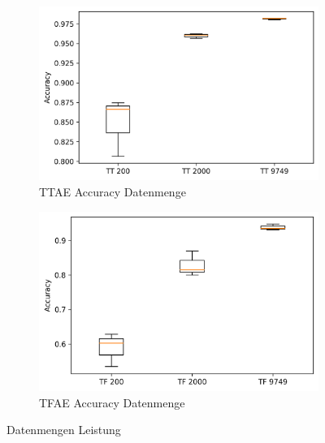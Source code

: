 	\begin{figure}[h]
		\centering
		\begin{subfigure}[c]{0.49\textwidth}			
			\includegraphics[width=1\textwidth,center]{bilder/Hauptteil/Transfer_Logs_Datenmenge/Acc_Transfer_Logs_data.png}
			\caption{TTAE Accuracy Datenmenge}
			\label{img:TT_ACC_DATA}	
		\end{subfigure}
		\begin{subfigure}[c]{0.49\textwidth}			
			\includegraphics[width=1\textwidth, center]{bilder/Hauptteil/Transfer_Logs_Datenmenge/Acc_MT_Logs_data.png}
			\caption{TFAE Accuracy Datenmenge}
			\label{img:TF_ACC_DATA}	
		\end{subfigure}
	
		\caption{Datenmengen Leistung}
		\label{img:DatenmengenLeistung}
	\end{figure}
		
		
		
		
		
		
		
		
			
		
		
		
		
		
		
		
	
	